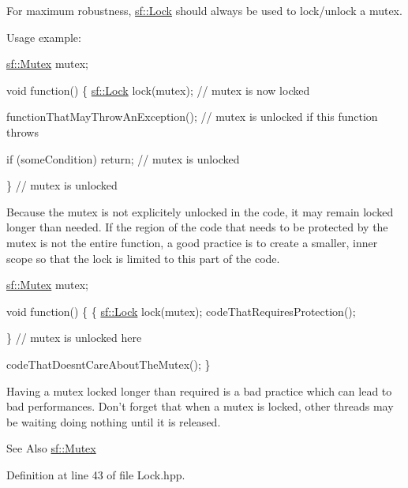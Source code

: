 For maximum robustness, \hyperlink{classsf_1_1Lock}{sf\-::\-Lock} should always be used to lock/unlock a mutex.

Usage example\-: 
\begin{DoxyCode}
\hyperlink{classsf_1_1Mutex}{sf::Mutex} mutex;

\textcolor{keywordtype}{void} \textcolor{keyword}{function}()
\{
    \hyperlink{classsf_1_1Lock}{sf::Lock} lock(mutex); \textcolor{comment}{// mutex is now locked}

    functionThatMayThrowAnException(); \textcolor{comment}{// mutex is unlocked if this function throws}

    \textcolor{keywordflow}{if} (someCondition)
        \textcolor{keywordflow}{return}; \textcolor{comment}{// mutex is unlocked}

\} \textcolor{comment}{// mutex is unlocked}
\end{DoxyCode}


Because the mutex is not explicitely unlocked in the code, it may remain locked longer than needed. If the region of the code that needs to be protected by the mutex is not the entire function, a good practice is to create a smaller, inner scope so that the lock is limited to this part of the code.


\begin{DoxyCode}
\hyperlink{classsf_1_1Mutex}{sf::Mutex} mutex;

\textcolor{keywordtype}{void} \textcolor{keyword}{function}()
\{
    \{
      \hyperlink{classsf_1_1Lock}{sf::Lock} lock(mutex);
      codeThatRequiresProtection();

    \} \textcolor{comment}{// mutex is unlocked here}

    codeThatDoesntCareAboutTheMutex();
\}
\end{DoxyCode}


Having a mutex locked longer than required is a bad practice which can lead to bad performances. Don't forget that when a mutex is locked, other threads may be waiting doing nothing until it is released.

\begin{DoxySeeAlso}{See Also}
\hyperlink{classsf_1_1Mutex}{sf\-::\-Mutex} 
\end{DoxySeeAlso}


Definition at line 43 of file Lock.\-hpp.



